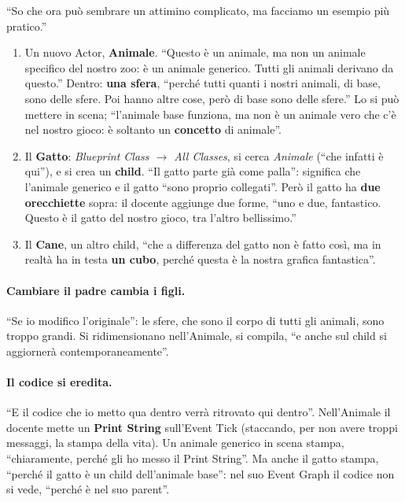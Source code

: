 ``So che ora può sembrare un attimino complicato, ma facciamo un esempio più
pratico.''
\begin{enumerate}
  \item Un nuovo Actor, \textbf{Animale}. ``Questo è un animale, ma non un animale
        specifico del nostro zoo: è un animale generico. Tutti gli animali
        derivano da questo.'' Dentro: \textbf{una sfera}, ``perché tutti quanti i
        nostri animali, di base, sono delle sfere. Poi hanno altre cose, però di
        base sono delle sfere.'' Lo si può mettere in scena; ``l'animale base
        funziona, ma non è un animale vero che c'è nel nostro gioco: è soltanto
        un \textbf{concetto} di animale''.
  \item Il \textbf{Gatto}: \emph{Blueprint Class $\rightarrow$ All Classes}, si
        cerca \emph{Animale} (``che infatti è qui''), e si crea un
        \textbf{child}. ``Il gatto parte già come palla'': significa che
        l'animale generico e il gatto ``sono proprio collegati''. Però il gatto ha
        \textbf{due orecchiette} sopra: il docente aggiunge due forme, ``uno e
        due, fantastico. Questo è il gatto del nostro gioco, tra l'altro
        bellissimo.''
  \item Il \textbf{Cane}, un altro child, ``che a differenza del gatto non è
        fatto così, ma in realtà ha in testa \textbf{un cubo}, perché questa è
        la nostra grafica fantastica''.
\end{enumerate}

\paragraph{Cambiare il padre cambia i figli.} ``Se io modifico l'originale'':
le sfere, che sono il corpo di tutti gli animali, sono troppo grandi. Si
ridimensionano nell'Animale, si compila, ``e anche sul child si aggiornerà
contemporaneamente''.

\paragraph{Il codice si eredita.} ``E il codice che io metto qua dentro verrà
ritrovato qui dentro''. Nell'Animale il docente mette un \textbf{Print String}
sull'Event Tick (staccando, per non avere troppi messaggi, la stampa della
vita). Un animale generico in scena stampa, ``chiaramente, perché gli ho messo
il Print String''. Ma anche il gatto stampa, ``perché il gatto è un child
dell'animale base'': nel suo Event Graph il codice non si vede, ``perché è nel
suo parent''.


